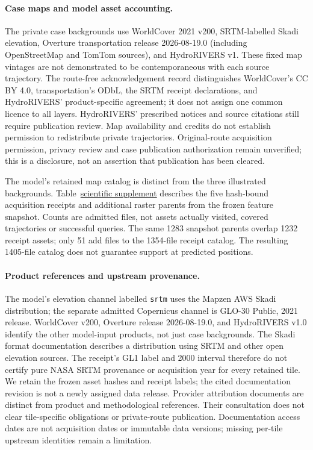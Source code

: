 \paragraph{Case maps and model asset accounting.}
The private case backgrounds use WorldCover 2021 v200\cite{worldcover2021},
SRTM-labelled Skadi elevation\cite{mapzenterrain}, Overture transportation release 2026-08-19.0
(including OpenStreetMap and TomTom sources)\cite{overture202608,overtureattribution}, and
HydroRIVERS v1\cite{hydrorivers2013,hydroriverslicense}.
These fixed map vintages are not demonstrated to be contemporaneous with
each source trajectory. The route-free acknowledgement record
 distinguishes
WorldCover's CC BY 4.0, transportation's ODbL, the SRTM receipt declarations,
and HydroRIVERS' product-specific agreement; it does not assign one common
licence to all layers. HydroRIVERS' prescribed notices and source citations
still require publication review. Map availability and credits do not
establish permission to redistribute private trajectories. Original-route
acquisition permission, privacy review and case publication authorization
remain unverified; this is a disclosure, not an assertion that publication
has been cleared.

The model's retained map catalog is distinct from the three illustrated
backgrounds. Table~\href{supplement.pdf\#tab:model-map-catalog}{scientific supplement} describes the five hash-bound
acquisition receipts and additional raster parents from the frozen feature
snapshot. Counts are admitted files, not assets actually visited, covered
trajectories or successful queries. The same 1283 snapshot parents overlap
1232 receipt assets; only 51 add files to the 1354-file receipt catalog.
The resulting 1405-file catalog does not guarantee support at predicted positions.

\paragraph{Product references and upstream provenance.}
The model's elevation channel labelled \texttt{srtm} uses the Mapzen AWS
Skadi distribution\cite{mapzenterrain}; the separate admitted Copernicus
channel is GLO-30 Public, 2021 release\cite{copernicusdem2021}.
WorldCover v200\cite{worldcover2021}, Overture release
2026-08-19.0\cite{overture202608}, and HydroRIVERS v1.0\cite{hydrorivers2013,hydroriverslicense}
identify the other model-input products, not just case backgrounds.
The Skadi format documentation describes a distribution using SRTM and
other open elevation sources. The receipt's GL1 label and 2000 interval
therefore do not certify pure NASA SRTM provenance or acquisition year for
every retained tile. We retain the frozen asset hashes and receipt labels;
the cited documentation revision is not a newly assigned data release.
Provider attribution documents\cite{mapzenattribution,overtureattribution,hydroriverslicense}
are distinct from product and methodological references. Their consultation
does not clear tile-specific obligations or private-route publication.
Documentation access dates are not acquisition dates or immutable data
versions; missing per-tile upstream identities remain a limitation.


